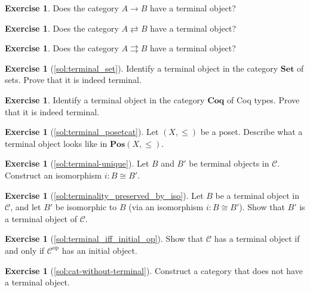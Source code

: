 \documentclass[a4paper,11pt, oneside,titlepage=false]{scrbook}
\theoremstyle{plain}
\theoremstyle{definition}
\newtheorem{exer}[thm]{Exercise}
\newcommand{\Cat}[1]{\mathcal{#1}}
\newcommand{\CC}{\Cat{C}}
\newcommand{\Catb}[1]{\mathbf{#1}}
\newcommand{\SET}{\Catb{Set}}
\newcommand{\POS}{\Catb{Pos}}
\newcommand{\COQ}{\Catb{Coq}}
\newcommand{\op}[1]{\ensuremath{{#1}^\text{op}}}
\begin{document}
\begin{exer}
  Does the category $A \to B$ have a terminal object?
\end{exer}

\begin{exer}
  Does the category $A \rightleftarrows B$ have a terminal object?
\end{exer}

\begin{exer}
  Does the category $A \rightrightarrows B$ have a terminal object?
\end{exer}



\begin{exer}[\cref{sol:terminal_set}]\label{exer:terminal_set}
  Identify a terminal object in the category $\SET$ of sets.
  Prove that it is indeed terminal.
\end{exer}

\begin{exer}
  Identify a terminal object in the category $\COQ$ of Coq types.
  Prove that it is indeed terminal.
\end{exer}

\begin{exer}[\cref{sol:terminal_posetcat}]\label{exer:terminal_posetcat}
  Let $(X,\leq)$ be a poset. Describe what a terminal object looks like in  $\POS(X,\leq)$.
\end{exer}

\begin{exer}[\cref{sol:terminal-unique}]\label{exer:terminal-unique}
  Let $B$ and $B'$ be terminal objects in $\CC$. Construct an isomorphism $i : B \cong B'$.
\end{exer}

\begin{exer}[\cref{sol:terminality_preserved_by_iso}]\label{exer:terminality_preserved_by_iso}
  Let $B$ be a terminal object in $\CC$, and let $B'$ be isomorphic to $B$ (via an isomorphism $i : B \cong B'$).
  Show that $B'$ is a terminal object of $\CC$.
\end{exer}

\begin{exer}[\cref{sol:terminal_iff_initial_op}]\label{exer:terminal_iff_initial_op}
  Show that $\CC$ has a terminal object if and only if $\op\CC$ has an initial object.
\end{exer}

\begin{exer}[\cref{sol:cat-without-terminal}]\label{exer:cat-without-terminal}
  Construct a category that does not have a terminal object.
\end{exer}
\end{document}
